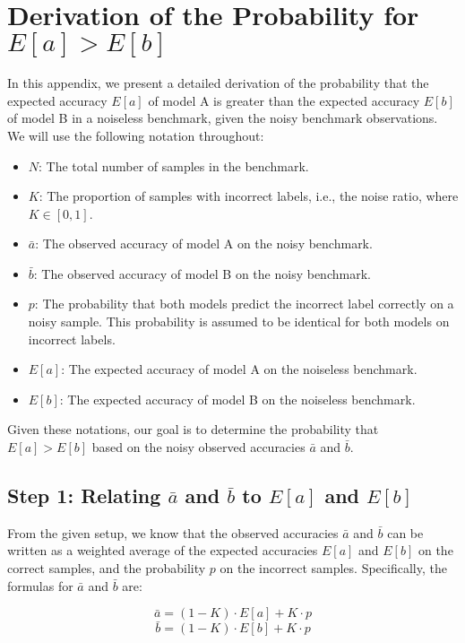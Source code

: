\section{Derivation of the Probability for \( E[a] > E[b] \)}
\label{sec:prof}
In this appendix, we present a detailed derivation of the probability that the expected accuracy \( E[a] \) of model A is greater than the expected accuracy \( E[b] \) of model B in a noiseless benchmark, given the noisy benchmark observations. We will use the following notation throughout:

\begin{itemize}
    \item \( N \): The total number of samples in the benchmark.
    \item \( K \): The proportion of samples with incorrect labels, i.e., the noise ratio, where \( K \in [0,1] \).
    \item \( \bar{a} \): The observed accuracy of model A on the noisy benchmark.
    \item \( \bar{b} \): The observed accuracy of model B on the noisy benchmark.
    \item \( p \): The probability that both models predict the incorrect label correctly on a noisy sample. This probability is assumed to be identical for both models on incorrect labels.
    \item \( E[a] \): The expected accuracy of model A on the noiseless benchmark.
    \item \( E[b] \): The expected accuracy of model B on the noiseless benchmark.
\end{itemize}

Given these notations, our goal is to determine the probability that \( E[a] > E[b] \) based on the noisy observed accuracies \( \bar{a} \) and \( \bar{b} \).

\subsection*{Step 1: Relating \( \bar{a} \) and \( \bar{b} \) to \( E[a] \) and \( E[b] \)}

From the given setup, we know that the observed accuracies \( \bar{a} \) and \( \bar{b} \) can be written as a weighted average of the expected accuracies \( E[a] \) and \( E[b] \) on the correct samples, and the probability \( p \) on the incorrect samples. Specifically, the formulas for \( \bar{a} \) and \( \bar{b} \) are:

\[
\bar{a} = (1 - K) \cdot E[a] + K \cdot p
\]
\[
\bar{b} = (1 - K) \cdot E[b] + K \cdot p
\]

